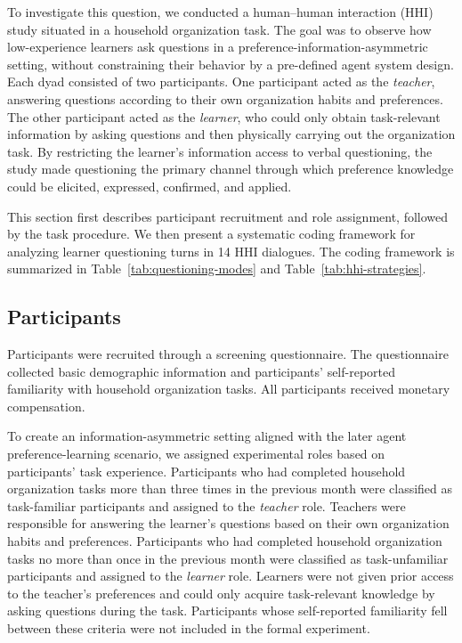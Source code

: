 \documentclass[manuscript,review,anonymous]{acmart}
\begin{document}
To investigate this question, we conducted a human--human interaction (HHI) study situated in a household organization task. The goal was to observe how low-experience learners ask questions in a preference-information-asymmetric setting, without constraining their behavior by a pre-defined agent system design. Each dyad consisted of two participants. One participant acted as the \emph{teacher}, answering questions according to their own organization habits and preferences. The other participant acted as the \emph{learner}, who could only obtain task-relevant information by asking questions and then physically carrying out the organization task. By restricting the learner's information access to verbal questioning, the study made questioning the primary channel through which preference knowledge could be elicited, expressed, confirmed, and applied.

This section first describes participant recruitment and role assignment, followed by the task procedure. We then present a systematic coding framework for analyzing learner questioning turns in 14 HHI dialogues. The coding framework is summarized in Table~\ref{tab:questioning-modes} and Table~\ref{tab:hhi-strategies}.

\subsection{Participants}
\label{sec:hhi-participants}

Participants were recruited through a screening questionnaire. The questionnaire collected basic demographic information and participants' self-reported familiarity with household organization tasks. All participants received monetary compensation.

To create an information-asymmetric setting aligned with the later agent preference-learning scenario, we assigned experimental roles based on participants' task experience. Participants who had completed household organization tasks more than three times in the previous month were classified as task-familiar participants and assigned to the \emph{teacher} role. Teachers were responsible for answering the learner's questions based on their own organization habits and preferences. Participants who had completed household organization tasks no more than once in the previous month were classified as task-unfamiliar participants and assigned to the \emph{learner} role. Learners were not given prior access to the teacher's preferences and could only acquire task-relevant knowledge by asking questions during the task. Participants whose self-reported familiarity fell between these criteria were not included in the formal experiment.
\end{document}
